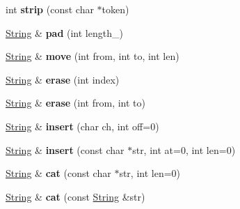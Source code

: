 \begin{DoxyCompactItemize}
\item 
int {\bfseries strip} (const char $\ast$token)\hypertarget{class_magnum_1_1_string_a01e5aecb52fad20d5b133a27fe90a137}{}\label{class_magnum_1_1_string_a01e5aecb52fad20d5b133a27fe90a137}

\item 
\hyperlink{class_magnum_1_1_string}{String} \& {\bfseries pad} (int length\+\_\+)\hypertarget{class_magnum_1_1_string_ab24d5e16ba6c6a90552ae20cc66e7ca8}{}\label{class_magnum_1_1_string_ab24d5e16ba6c6a90552ae20cc66e7ca8}

\item 
\hyperlink{class_magnum_1_1_string}{String} \& {\bfseries move} (int from, int to, int len)\hypertarget{class_magnum_1_1_string_a916bb8384ff18a2de12bdc52ec11d0ea}{}\label{class_magnum_1_1_string_a916bb8384ff18a2de12bdc52ec11d0ea}

\item 
\hyperlink{class_magnum_1_1_string}{String} \& {\bfseries erase} (int index)\hypertarget{class_magnum_1_1_string_a101eb25a2ddffc7a9bbec46f2056f08c}{}\label{class_magnum_1_1_string_a101eb25a2ddffc7a9bbec46f2056f08c}

\item 
\hyperlink{class_magnum_1_1_string}{String} \& {\bfseries erase} (int from, int to)\hypertarget{class_magnum_1_1_string_aef9a6c14407799ca0d555f537be3d12a}{}\label{class_magnum_1_1_string_aef9a6c14407799ca0d555f537be3d12a}

\item 
\hyperlink{class_magnum_1_1_string}{String} \& {\bfseries insert} (char ch, int off=0)\hypertarget{class_magnum_1_1_string_ad0d8d5a03dc5f16f4014d8cbd9116f66}{}\label{class_magnum_1_1_string_ad0d8d5a03dc5f16f4014d8cbd9116f66}

\item 
\hyperlink{class_magnum_1_1_string}{String} \& {\bfseries insert} (const char $\ast$str, int at=0, int len=0)\hypertarget{class_magnum_1_1_string_ad03a688bf13d2d12b82d270cccc1acde}{}\label{class_magnum_1_1_string_ad03a688bf13d2d12b82d270cccc1acde}

\item 
\hyperlink{class_magnum_1_1_string}{String} \& {\bfseries cat} (const char $\ast$str, int len=0)\hypertarget{class_magnum_1_1_string_a92c99d95ed95eca91b3ee2088a7d5d33}{}\label{class_magnum_1_1_string_a92c99d95ed95eca91b3ee2088a7d5d33}

\item 
\hyperlink{class_magnum_1_1_string}{String} \& {\bfseries cat} (const \hyperlink{class_magnum_1_1_string}{String} \&str)\hypertarget{class_magnum_1_1_string_a0342215812afeedc2f8e19a66be169dd}{}\label{class_magnum_1_1_string_a0342215812afeedc2f8e19a66be169dd}


\end{DoxyCompactItemize}
